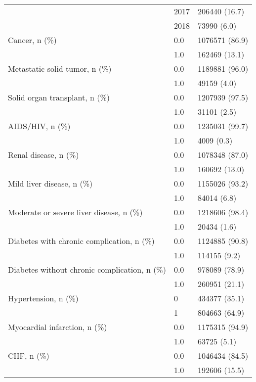 \begin{tabular}{lll}
                                       & 2017 &      206440 (16.7) \\
                                       & 2018 &        73990 (6.0) \\
Cancer, n (\%) & 0.0 &     1076571 (86.9) \\
                                       & 1.0 &      162469 (13.1) \\
Metastatic solid tumor, n (\%) & 0.0 &     1189881 (96.0) \\
                                       & 1.0 &        49159 (4.0) \\
Solid organ transplant, n (\%) & 0.0 &     1207939 (97.5) \\
                                       & 1.0 &        31101 (2.5) \\
AIDS/HIV, n (\%) & 0.0 &     1235031 (99.7) \\
                                       & 1.0 &         4009 (0.3) \\
Renal disease, n (\%) & 0.0 &     1078348 (87.0) \\
                                       & 1.0 &      160692 (13.0) \\
Mild liver disease, n (\%) & 0.0 &     1155026 (93.2) \\
                                       & 1.0 &        84014 (6.8) \\
Moderate or severe liver disease, n (\%) & 0.0 &     1218606 (98.4) \\
                                       & 1.0 &        20434 (1.6) \\
Diabetes with chronic complication, n (\%) & 0.0 &     1124885 (90.8) \\
                                       & 1.0 &       114155 (9.2) \\
Diabetes without chronic complication, n (\%) & 0.0 &      978089 (78.9) \\
                                       & 1.0 &      260951 (21.1) \\
Hypertension, n (\%) & 0 &      434377 (35.1) \\
                                       & 1 &      804663 (64.9) \\
Myocardial infarction, n (\%) & 0.0 &     1175315 (94.9) \\
                                       & 1.0 &        63725 (5.1) \\
CHF, n (\%) & 0.0 &     1046434 (84.5) \\
                                       & 1.0 &      192606 (15.5) \\

\end{tabular}
